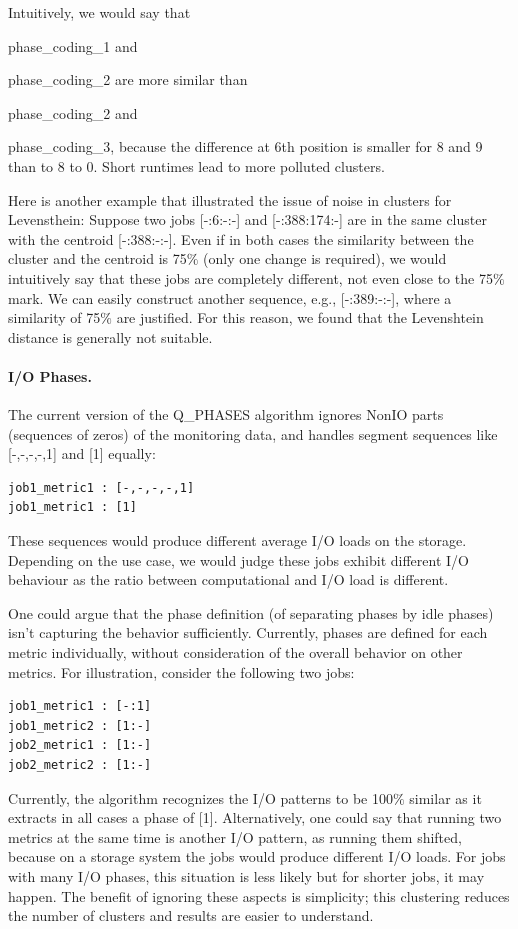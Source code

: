 \documentclass{jhps}
\begin{document}
Intuitively, we would say that {phase\_coding\_1 and{ phase\_coding\_2 are more similar than {phase\_coding\_2 and {phase\_coding\_3, because the difference at 6th position is smaller for 8 and 9 than to 8 to 0.
Short runtimes lead to more polluted clusters.

Here is another example that illustrated the issue of noise in clusters for Levensthein:
Suppose two jobs [-:6:-:-] and [-:388:174:-] are in the same cluster with the centroid [-:388:-:-].
Even if in both cases the similarity between the cluster and the centroid is 75$\%$  (only one change is required), we would intuitively say that these jobs are completely different, not even close to the 75$\%$  mark.
We can easily construct another sequence, e.g., [-:389:-:-], where a similarity of 75$\%$  are justified.
For this reason, we found that the Levenshtein distance is generally not suitable.

\paragraph{I/O Phases.}
The current version of the Q\_PHASES algorithm ignores NonIO parts (sequences of zeros) of the monitoring data, and handles segment sequences like [-,-,-,-,1] and [1] equally:
\begin{lstlisting}
job1_metric1 : [-,-,-,-,1]
job1_metric1 : [1]
\end{lstlisting}

These sequences would produce different average I/O loads on the storage.
Depending on the use case, we would judge these jobs exhibit different I/O behaviour as the ratio between computational and I/O load is different.

One could argue that the phase definition (of separating phases by idle phases) isn't capturing the behavior sufficiently.
Currently, phases are defined for each metric individually, without consideration of the overall behavior on  other metrics.
For illustration, consider the following two jobs:
\begin{lstlisting}
job1_metric1 : [-:1]
job1_metric2 : [1:-]
job2_metric1 : [1:-]
job2_metric2 : [1:-]
\end{lstlisting}

Currently, the algorithm recognizes the I/O patterns to be 100$\%$ similar as it extracts in all cases a phase of [1].
Alternatively, one could say that running two metrics at the same time is another I/O pattern, as running them shifted, because on a storage system the jobs would produce different I/O loads.
For jobs with many I/O phases, this situation is less likely but for shorter jobs, it may happen.
The benefit of ignoring these aspects is simplicity; this clustering reduces the number of clusters and  results are easier to understand.

}}}}
\end{document}
